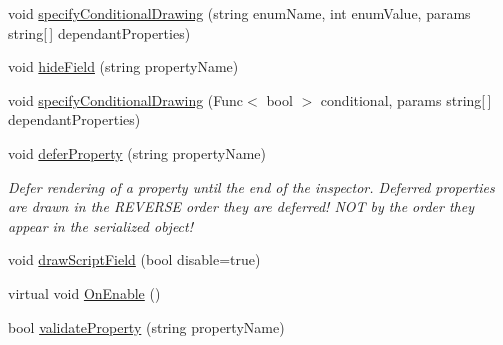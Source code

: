 \begin{DoxyCompactItemize}
void \mbox{\hyperlink{class_leap_1_1_unity_1_1_custom_editor_base_af83f5e330901a815e05aa3a825128ab9}{specify\+Conditional\+Drawing}} (string enum\+Name, int enum\+Value, params string\mbox{[}$\,$\mbox{]} dependant\+Properties)
\item 
void \mbox{\hyperlink{class_leap_1_1_unity_1_1_custom_editor_base_a4d6cf21850698537d7bf81aa27acc6c9}{hide\+Field}} (string property\+Name)
\item 
void \mbox{\hyperlink{class_leap_1_1_unity_1_1_custom_editor_base_a397cd9e96452b55644ff0b4dc4c4db9e}{specify\+Conditional\+Drawing}} (Func$<$ bool $>$ conditional, params string\mbox{[}$\,$\mbox{]} dependant\+Properties)
\item 
void \mbox{\hyperlink{class_leap_1_1_unity_1_1_custom_editor_base_a1f7e4b6641ca944bac1efc1679a40afd}{defer\+Property}} (string property\+Name)
\begin{DoxyCompactList}\small\item\em Defer rendering of a property until the end of the inspector. Deferred properties are drawn in the R\+E\+V\+E\+R\+SE order they are deferred! N\+OT by the order they appear in the serialized object! \end{DoxyCompactList}\item 
void \mbox{\hyperlink{class_leap_1_1_unity_1_1_custom_editor_base_a7f6ef123a9be58a8891f68fdc4657d64}{draw\+Script\+Field}} (bool disable=true)
\item 
virtual void \mbox{\hyperlink{class_leap_1_1_unity_1_1_custom_editor_base_a2268bc01655342bd3da5ae015bfa2f93}{On\+Enable}} ()
\item 
bool \mbox{\hyperlink{class_leap_1_1_unity_1_1_custom_editor_base_a1b822af17dba348a6230822cd0731e25}{validate\+Property}} (string property\+Name)
\end{DoxyCompactItemize}
